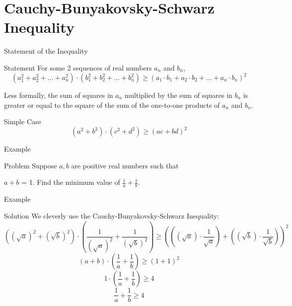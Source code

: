 \section{Cauchy-Bunyakovsky-Schwarz Inequality}
\begin{namedframe}{Statement of the Inequality}
	\begin{block}{Statement}
	For some 2 sequences of real numbers $a_n$ and $b_n$,
		\[(a_1^2 + a_2^2 + ... + a_n^2) \cdot (b_1^2 + b_2^2 + ... + b_n^2) \geq (a_1 \cdot b_1 + a_2 \cdot b_2 + ... + a_n \cdot b_n)^2 \]
	\end{block}

	Less formally, the sum of squares in $a_n$ multiplied by the sum of squares in $b_n$ is greater or equal to the square of the sum of the
	one-to-one products of $a_n$ and $b_n$.
	\pause

	\begin{block}{Simple Case}
		\[(a^2 + b^2)\cdot(c^2 + d^2) \geq (ac + bd)^2\]
	\end{block}
\end{namedframe}

\begin{namedframe}{Example}
	\begin{exampleblock}{Problem}
		Suppose $a, b$ are positive real numbers such that
		
		$a + b$ = 1. Find the minimum value of
		$\frac{1}{a} + \frac{1}{b}$.
	\end{exampleblock}
\end{namedframe}

\begin{namedframe}{Example}
	\begin{block}{Solution}
		We cleverly use the Cauchy-Bunyakovsky-Schwarz Inequality:
		\footnotesize
		\[ \left( (\sqrt{a})^2 + (\sqrt{b})^2 \right) \cdot \left( \frac{1}{(\sqrt{a})^2} + \frac{1}{(\sqrt{b})^2} \right) \geq \left ( \left((\sqrt{a}) \cdot \frac{1}{\sqrt{a}} \right) + \left((\sqrt{b}) \cdot \frac{1}{\sqrt{b}} \right) \right)^2 \]
		\[ (a + b) \cdot \left( \frac{1}{a} + \frac{1}{b} \right) \geq (1 + 1)^2 \]
		\[ 1 \cdot \left( \frac{1}{a} + \frac{1}{b} \right) \geq 4\]
		\[\frac{1}{a} + \frac{1}{b} \geq 4\]
	\end{block}
\end{namedframe}
